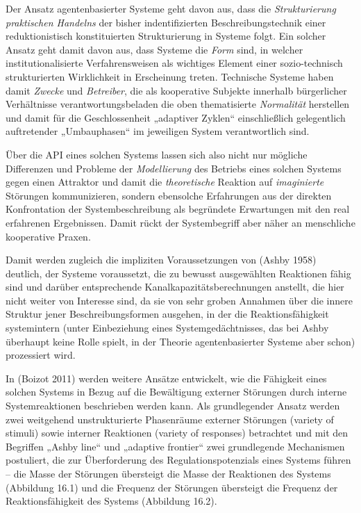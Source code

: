 \documentclass[11pt,a4paper]{article}
\begin{document}
Der Ansatz agentenbasierter Systeme geht davon aus, dass die
\emph{Strukturierung praktischen Handelns} der bisher indentifizierten
Beschreibungstechnik einer reduktionistisch konstituierten Strukturierung in
Systeme folgt. Ein solcher Ansatz geht damit davon aus, dass Systeme die
\emph{Form} sind, in welcher institutionalisierte Verfahrensweisen als
wichtiges Element einer sozio-technisch strukturierten Wirklichkeit in
Erscheinung treten. Technische Systeme haben damit \emph{Zwecke} und
\emph{Betreiber}, die als kooperative Subjekte innerhalb bürgerlicher
Verhältnisse verantwortungsbeladen die oben thematisierte \emph{Normalität}
herstellen und damit für die Geschlossenheit „adaptiver Zyklen“ einschließlich
gelegentlich auftretender „Umbauphasen“ im jeweiligen System verantwortlich
sind.

Über die API eines solchen Systems lassen sich also nicht nur mögliche
Differenzen und Probleme der \emph{Modellierung} des Betriebs eines solchen
Systems gegen einen Attraktor und damit die \emph{theoretische} Reaktion auf
\emph{imaginierte} Störungen kommunizieren, sondern ebensolche Erfahrungen aus
der direkten Konfrontation der Systembeschreibung als begründete Erwartungen
mit den real erfahrenen Ergebnissen. Damit rückt der Systembegriff aber näher
an menschliche kooperative Praxen.

Damit werden zugleich die impliziten Voraussetzungen von (Ashby 1958)
deutlich, der Systeme voraussetzt, die zu bewusst ausgewählten Reaktionen
fähig sind und darüber entsprechende Kanalkapazitätsberechnungen anstellt, die
hier nicht weiter von Interesse sind, da sie von sehr groben Annahmen über die
innere Struktur jener Beschreibungsformen ausgehen, in der die
Reaktionsfähigkeit systemintern (unter Einbeziehung eines Systemgedächtnisses,
das bei Ashby überhaupt keine Rolle spielt, in der Theorie agentenbasierter
Systeme aber schon) prozessiert wird.

In (Boizot 2011) werden weitere Ansätze entwickelt, wie die Fähigkeit eines
solchen Systems in Bezug auf die Bewältigung externer Störungen durch interne
Systemreaktionen beschrieben werden kann. Als grundlegender Ansatz werden zwei
weitgehend unstrukturierte Phasenräume externer Störungen (variety of stimuli)
sowie interner Reaktionen (variety of responses) betrachtet und mit den
Begriffen „Ashby line“ und „adaptive frontier“ zwei grundlegende Mechanismen
postuliert, die zur Überforderung des Regulationspotenzials eines Systems
führen -- die Masse der Störungen übersteigt die Masse der Reaktionen des
Systems (Abbildung 16.1) und die Frequenz der Störungen übersteigt die
Frequenz der Reaktionsfähigkeit des Systems (Abbildung 16.2).
\end{document}
